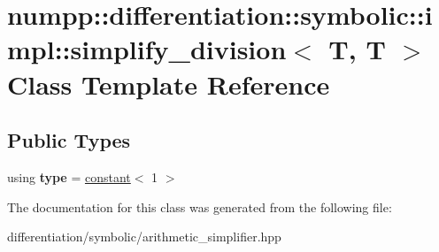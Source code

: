 \hypertarget{classnumpp_1_1differentiation_1_1symbolic_1_1impl_1_1simplify__division_3_01T_00_01T_01_4}{}\section{numpp\+:\+:differentiation\+:\+:symbolic\+:\+:impl\+:\+:simplify\+\_\+division$<$ T, T $>$ Class Template Reference}
\label{classnumpp_1_1differentiation_1_1symbolic_1_1impl_1_1simplify__division_3_01T_00_01T_01_4}
\subsection*{Public Types}
\begin{DoxyCompactItemize}
\item 
\mbox{\label{classnumpp_1_1differentiation_1_1symbolic_1_1impl_1_1simplify__division_3_01T_00_01T_01_4_a9113989b368d92fced155ad537754f47}} 
using {\bfseries type} = \hyperlink{classnumpp_1_1differentiation_1_1symbolic_1_1constant}{constant}$<$ 1 $>$
\end{DoxyCompactItemize}


The documentation for this class was generated from the following file\+:\begin{DoxyCompactItemize}
\item 
differentiation/symbolic/arithmetic\+\_\+simplifier.\+hpp\end{DoxyCompactItemize}
